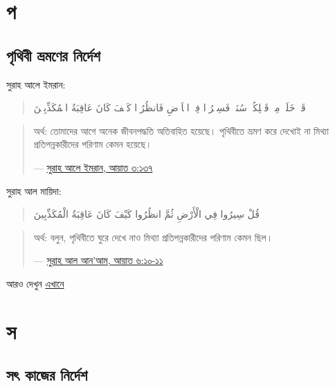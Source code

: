 \documentclass[
]{book}
\begin{document}
\hypertarget{p}{%
\section*{প}\label{p}}

\hypertarget{traveling}{%
\subsection*{পৃথিবী ভ্রমণের নির্দেশ}\label{traveling}}

সুরাহ আলে ইমরান:

\begin{quote}
قَدۡ خَلَتۡ مِنۡ قَبۡلِكُمۡ سُنَنٌۙ فَسِيۡرُوۡا فِىۡ الۡاَرۡضِ فَانظُرُوۡا كَيۡفَ كَانَ عَاقِبَةُ الۡمُكَذِّبِيۡنَ
\end{quote}

\begin{quote}
অর্থ: তোমাদের আগে অনেক জীবনপদ্ধতি অতিবাহিত হয়েছে। পৃথিবীতে ভ্রমণ করে দেখোই না মিথ্যা প্রতিপন্নকারীদের পরিণাম কেমন হয়েছে।

--- \href{https://tanzil.net/\#3:137}{সুরাহ আলে ইমরান, আয়াত ৩:১৩৭}
\end{quote}

সুরাহ আল মায়িদা:

\begin{quote}
قُلْ سِيرُوا فِي الْأَرْضِ ثُمَّ انظُرُوا كَيْفَ كَانَ عَاقِبَةُ الْمُكَذِّبِينَ
\end{quote}

\begin{quote}
অর্থ: বলুন, পৃথিবীতে ঘুরে দেখে নাও মিথ্যা প্রতিপন্নকারীদের পরিণাম কেমন ছিল।

--- \href{https://tanzil.net/\#6:11}{সুরাহ আল আন'আম, আয়াত ৬:১০-১১}
\end{quote}

আরও দেখুন \href{../islam/travelling.al}{এখানে}

\hypertarget{s}{%
\section*{স}\label{s}}

\hypertarget{enjoining-on-good-deeds}{%
\subsection*{সৎ কাজের নির্দেশ}\label{enjoining-on-good-deeds}}
\end{document}
